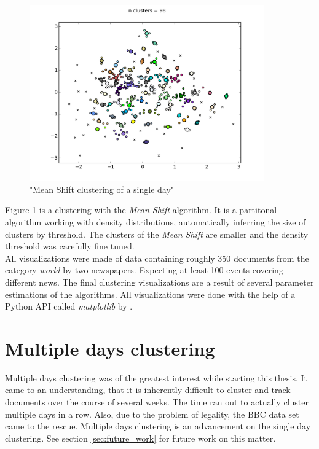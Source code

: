   \begin{figure}[h!]
    \centering
      \includegraphics[width=0.9\textwidth]{mean_shift_clustering.png}
      \caption{"Mean Shift clustering of a single day"}
      \label{mean_shift_clustering}
  \end{figure} 

Figure \ref{mean_shift_clustering} is a clustering with the \emph{Mean Shift} algorithm. It is a partitonal algorithm working with density distributions, automatically inferring the size of clusters by threshold. The clusters of the \emph{Mean Shift} are smaller and the density threshold was carefully fine tuned.\\ 

All visualizations were made of data containing roughly 350 documents from the category \emph{world} by two newspapers. Expecting at least 100 events covering different news. The final clustering visualizations are a result of several parameter estimations of the algorithms. All visualizations were done with the help of a Python API called \emph{matplotlib} by \cite{MatPlotHunter2007}.

\section{Multiple days clustering}
  Multiple days clustering was of the greatest interest while starting this thesis. It came to an understanding, that it is inherently difficult to cluster and track documents over the course of several weeks. The time ran out to actually cluster multiple days in a row. Also, due to the problem of legality, the BBC data set came to the rescue. Multiple days clustering is an advancement on the single day clustering. See section \ref{sec:future_work} for future work on this matter.



